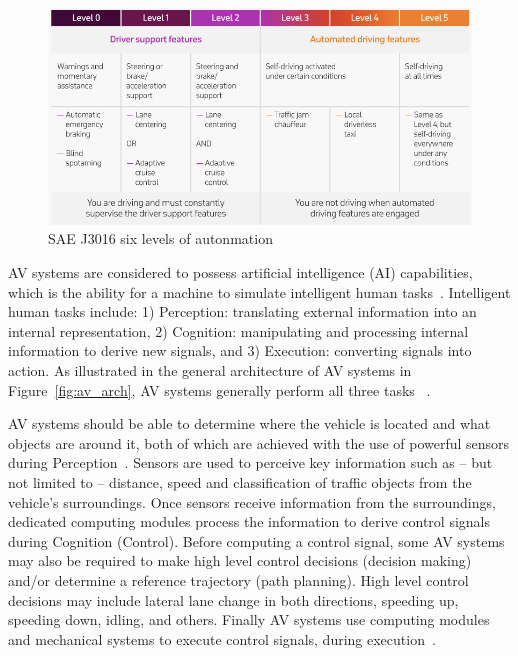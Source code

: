 \documentclass{article}
\begin{document}
\begin{figure}[htbp]
\begin{center}
\includegraphics[scale=0.6]{figures/sae_levels_of_auto.png}
\caption{SAE J3016 six levels of autonmation~\cite{AVSensors}}
\label{fig:autolevel}
\end{center}
\end{figure}

AV systems are considered to possess artificial intelligence (AI) capabilities, which is the ability for a machine to simulate intelligent human tasks~\cite{Malcolm1994}. Intelligent human tasks include: 1) Perception: translating external information into an internal representation, 2) Cognition: manipulating and processing internal information to derive new signals, and 3) Execution: converting signals into action. As illustrated in the general architecture of AV systems in Figure~\ref{fig:av_arch}, AV systems generally perform all three tasks ~\cite{Naoki2014}.

AV systems should be able to determine where the vehicle is located and what objects are around it, both of which are achieved with the use of powerful sensors during Perception~\cite{Naoki2014}. Sensors are used to perceive key information such as -- but not limited to -- distance, speed and classification of traffic objects from the vehicle’s surroundings.  Once sensors receive information from the surroundings, dedicated computing modules process the information to derive control signals during Cognition (Control). Before computing a control signal, some AV systems may also be required to make high level control decisions (decision making) and/or determine a reference trajectory (path planning). High level control decisions may include lateral lane change in both directions, speeding up, speeding down, idling, and others. Finally AV systems use computing modules and mechanical systems to execute control signals, during execution~\cite{Naoki2014}.
\end{document}
